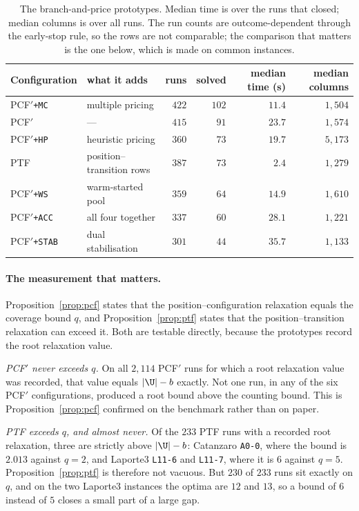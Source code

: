 \begin{table}[h]\centering
\footnotesize
\begin{tabular}{@{}llrrrr@{}}
\toprule
Configuration & what it adds & runs & solved & median time (s) & median columns\\
\midrule
PCF$'$\texttt{+MC}   & multiple pricing          & $422$ & $102$ & $11.4$ & $1{,}504$\\
PCF$'$               & ---                       & $415$ & $91$  & $23.7$ & $1{,}574$\\
PCF$'$\texttt{+HP}   & heuristic pricing         & $360$ & $73$  & $19.7$ & $5{,}173$\\
PTF                  & position--transition rows & $387$ & $73$  & $2.4$  & $1{,}279$\\
PCF$'$\texttt{+WS}   & warm-started pool         & $359$ & $64$  & $14.9$ & $1{,}610$\\
PCF$'$\texttt{+ACC}  & all four together         & $337$ & $60$  & $28.1$ & $1{,}221$\\
PCF$'$\texttt{+STAB} & dual stabilisation        & $301$ & $44$  & $35.7$ & $1{,}133$\\
\bottomrule
\end{tabular}
\caption{The branch-and-price prototypes. Median time is over the runs that closed;
median columns is over all runs. The run counts are outcome-dependent through the
early-stop rule, so the rows are not comparable; the comparison that matters is the
one below, which is made on common instances.}
\label{tab:bnp}
\end{table}

\paragraph{The measurement that matters.}
Proposition~\ref{prop:pcf} states that the position--configuration relaxation equals
the coverage bound $q$, and Proposition~\ref{prop:ptf} states that the
position--transition relaxation can exceed it. Both are testable directly, because the
prototypes record the root relaxation value.

\emph{PCF$'$ never exceeds $q$.} On all $2{,}114$ PCF$'$ runs for which a root
relaxation value was recorded, that value equals $\lvert\U\rvert-b$ exactly. Not one
run, in any of the six PCF$'$ configurations, produced a root bound above the counting
bound. This is Proposition~\ref{prop:pcf} confirmed on the benchmark rather than on
paper.

\emph{PTF exceeds $q$, and almost never.} Of the $233$ PTF runs with a recorded root
relaxation, three are strictly above $\lvert\U\rvert-b$: Catanzaro \texttt{A0-0}, where
the bound is $2.013$ against $q=2$, and Laporte3 \texttt{L11-6} and \texttt{L11-7},
where it is $6$ against $q=5$. Proposition~\ref{prop:ptf} is therefore not vacuous. But
$230$ of $233$ runs sit exactly on $q$, and on the two Laporte3 instances the optima
are $12$ and $13$, so a bound of $6$ instead of $5$ closes a small part of a large gap.

